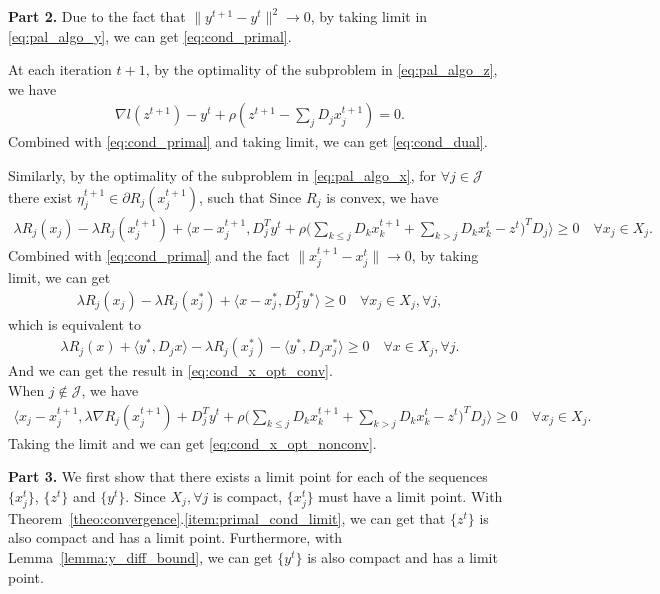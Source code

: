 {\bf Part 2.} Due to the fact that $\|y^{t+1}-y^t\|^2\rightarrow 0$, by taking limit in \eqref{eq:pal_algo_y}, we can get \eqref{eq:cond_primal}.

At each iteration $t+1$, by the optimality of the subproblem in \eqref{eq:pal_algo_z}, we have
\begin{align}
    \nabla l(z^{t+1}) - y^t + \rho (z^{t+1} - \sum_jD_jx_j^{t+1}) = 0.
\end{align}
Combined with \eqref{eq:cond_primal} and taking limit, we can get \eqref{eq:cond_dual}.

Similarly, by the optimality of the subproblem in \eqref{eq:pal_algo_x}, for $\forall j\in\mathcal{J}$ there exist $\eta_j^{t+1}\in\partial R_j(x_j^{t+1})$, such that
Since $R_j$ is convex, we have 
\begin{align}
    \lambda R_j(x_j) - \lambda R_j(x_j^{t+1}) + \big\langle x-x_j^{t+1}, D_j^Ty^t + \rho\big(\sum_{k\le j} D_kx_k^{t+1} + \sum_{k>j} D_kx_k^{t} - z^{t}\big)^T D_j\big\rangle \ge 0\quad \forall x_j\in X_j.
\end{align}
Combined with \eqref{eq:cond_primal} and the fact $\|x_j^{t+1} - x_j^{t}\|\rightarrow 0$, by taking limit, we can get
\begin{align}
    \lambda R_j(x_j) - \lambda R_j(x_j^*) + \big\langle x-x_j^{*}, D_j^Ty^* \big\rangle \ge 0\quad \forall x_j\in X_j, \forall j,
\end{align}
which is equivalent to 
\begin{align}
    \lambda R_j(x) + \big\langle y^*, D_jx \big\rangle- \lambda R_j(x_j^*) - \big\langle y^*, D_jx_j^{*} \big\rangle \ge 0\quad \forall x\in X_j, \forall j. 
\end{align}
And we can get the result in \eqref{eq:cond_x_opt_conv}. \\
When $j\not\in\mathcal{J}$, we have 
\begin{align}
    \big\langle x_j-x_j^{t+1}, \lambda \nabla R_j(x_j^{t+1}) + D_j^Ty^t + \rho\big(\sum_{k\le j} D_kx_k^{t+1} + \sum_{k>j} D_kx_k^{t} - z^{t}\big)^T D_j\big\rangle \ge 0\quad \forall x_j\in X_j.
\end{align}
Taking the limit and we can get \eqref{eq:cond_x_opt_nonconv}.

{\bf Part 3.} We first show that there exists a limit point for each of the sequences $\{x_j^t\}$, $\{z^t\}$ and $\{y^t\}$. Since $X_j, \forall j$ is compact, $\{x_j^t\}$ must have a limit point. With Theorem~\ref{theo:convergence}.\ref{item:primal_cond_limit}, we can get that $\{z^t\}$ is also compact and has a limit point. Furthermore, with Lemma~\ref{lemma:y_diff_bound}, we can get $\{y^t\}$ is also compact and has a limit point. 

